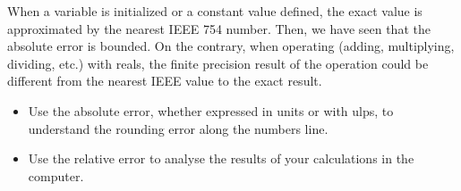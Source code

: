 When a variable is initialized or a constant value defined, the exact value is approximated by the nearest IEEE 754 number. Then, we have seen that the absolute error is bounded. 
On the contrary, when operating (adding, multiplying, dividing, etc.) with reals, the finite precision result of the operation could be different from the nearest IEEE value to the exact result. 

\begin{IN}
    \begin{itemize}
        \item Use the absolute error, whether expressed in units or with ulps, to understand the rounding error along the numbers line. 
        \item Use the relative error to analyse the results of your calculations in the computer.
    \end{itemize}   
\end{IN}  








